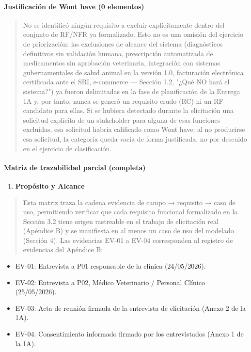 \documentclass[
]{article}
\begin{document}
\paragraph{Justificación de Won\textquotesingle t have (0
elementos)}\label{justificaciuxf3n-de-wont-have-0-elementos}

\begin{quote}
No se identificó ningún requisito a excluir explícitamente dentro del
conjunto de RF/NFR ya formalizado. Esto no es una omisión del ejercicio
de priorización: las exclusiones de alcance del sistema (diagnósticos
definitivos sin validación humana, prescripción automatizada de
medicamentos sin aprobación veterinaria, integración con sistemas
gubernamentales de salud animal en la versión 1.0, facturación
electrónica certificada ante el SRI, e-commerce --- Sección 1.2, "¿Qué
NO hará el sistema?") ya fueron delimitadas en la fase de planificación
de la Entrega 1A y, por tanto, nunca se generó un requisito crudo (RC)
ni un RF candidato para ellas. Si se hubiera detectado durante la
elicitación una solicitud explícita de un stakeholder para alguna de
esas funciones excluidas, esa solicitud habría calificado como
Won\textquotesingle t have; al no producirse esa solicitud, la categoría
queda vacía de forma justificada, no por descuido en el ejercicio de
clasificación.
\end{quote}

\paragraph{Matriz de trazabilidad parcial
(completa)}\label{matriz-de-trazabilidad-parcial-completa}

\begin{enumerate}
\def\labelenumi{\arabic{enumi}.}
\item
  \protect{}\label{_bookmark111}{}\textbf{Propósito y
  Alcance}
\end{enumerate}

\begin{quote}
Esta matriz traza la cadena evidencia de campo → requisito → caso de
uso, permitiendo verificar que cada requisito funcional formalizado en
la Sección 3.2 tiene origen rastreable en el trabajo de elicitación real
(Apéndice B) y se manifiesta en al menos un caso de uso del modelado
(Sección 4). Las evidencias EV-01 a EV-04 corresponden al registro de
evidencias del Apéndice B:
\end{quote}

\begin{itemize}
\item
  EV-01: Entrevista a P01 responsable de la clínica (24/05/2026).
\item
  EV-02: Entrevista a P02, Médico Veterinario / Personal Clínico
  (25/05/2026).
\item
  EV-03: Acta de reunión firmada de la entrevista de elicitación (Anexo
  2 de la 1A).
\item
  EV-04: Consentimiento informado firmado por los entrevistados (Anexo 1
  de la 1A).
\end{itemize}
\end{document}

